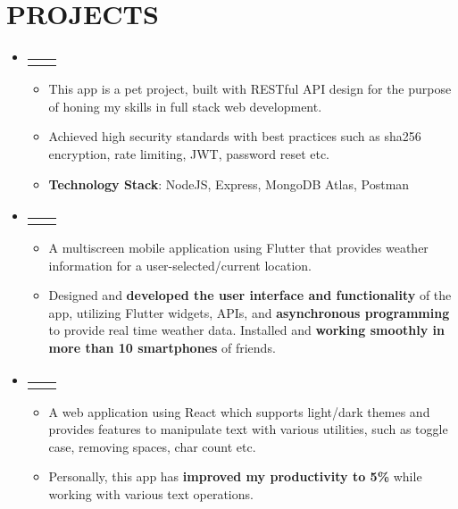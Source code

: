 \documentclass[letterpaper,10pt]{article}
\makeatletter
\newcommand{\myuline}[1]{%
  \uline{\phantom{#1}}%
  \llap{\contour{white}{#1}}%
}
\newcommand{\resumeItem}[1]{
  \item\small{
      {#1 \vspace{-1pt}}
    }
}
\newcommand{\resumeProjectHeading}[2]{
    \item
    \begin{tabular*}{\textwidth}{l@{\extracolsep{\fill}}r}
      #1 & {\color{dark-grey}} \\
    \end{tabular*}\vspace{-4pt}
}
\newcommand{\resumeSubHeadingListStart}{\begin{itemize}[leftmargin=0in, label={}]}
\newcommand{\resumeSubHeadingListEnd}{\end{itemize}}
\newcommand{\resumeItemListStart}{\begin{itemize}}
\newcommand{\resumeItemListEnd}{\end{itemize}\vspace{0pt}}
\makeatother
\begin{document}
\section{PROJECTS}
\resumeSubHeadingListStart
\resumeProjectHeading
{\textbf{\href{https://github.com/Pranav108/natours_node}{\myuline {Natours}}}}{Mar. 2022 -- Present}
\resumeItemListStart
\resumeItem{This app is a pet project, built with RESTful API design for the purpose of honing my skills in full stack web development.}
\resumeItem{Achieved high security standards with best practices such as sha256 encryption, rate limiting, JWT, password reset etc.}
\resumeItem{\textbf{Technology Stack}: NodeJS, Express, MongoDB Atlas, Postman}
\resumeItemListEnd

\resumeProjectHeading
{\textbf{\href{https://github.com/Pranav108/mousam}{\myuline {Mousam App}}}}{Dec. 2020 -- Jan. 2021}
\resumeItemListStart
\resumeItem{A multiscreen mobile application using Flutter that provides weather information for a user-selected/current location.}
\resumeItem{Designed and \textbf{developed the user interface and functionality} of the app, utilizing Flutter widgets, APIs, and \textbf{asynchronous programming} to provide real time weather data. Installed and \textbf{working smoothly in more than 10 smartphones} of friends.}
\resumeItemListEnd

\resumeProjectHeading
{\textbf{\href{https://github.com/Pranav108/text_utils}{\myuline {Text-Utils React App}}}} {Sep. 2021 -- Nov. 2021}
\resumeItemListStart
\resumeItem{A web application using React which supports light/dark themes and provides features to manipulate text with various utilities, such as toggle case, removing spaces, char count etc.}
\resumeItem{Personally, this app has \textbf{improved my productivity to 5\%} while working with various text operations.}
\resumeItemListEnd

\resumeSubHeadingListEnd
\end{document}
